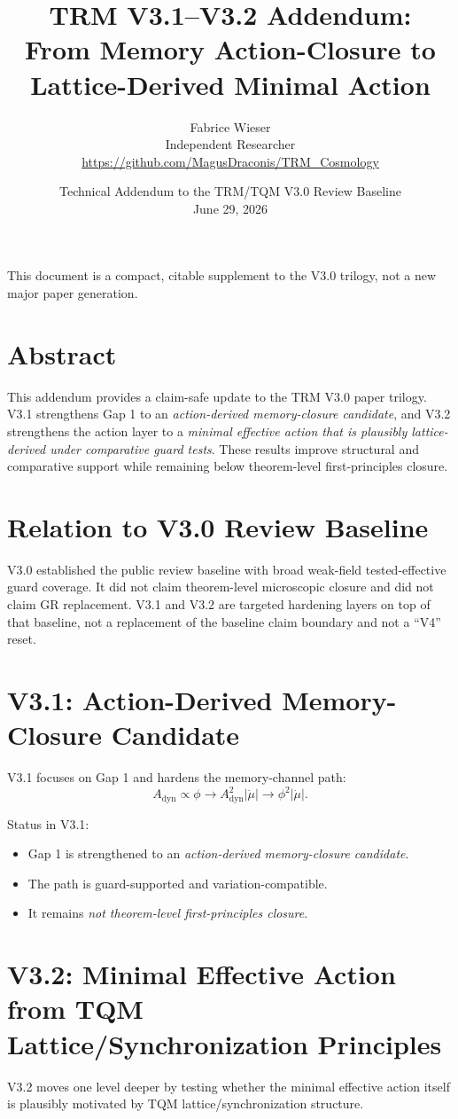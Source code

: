 \documentclass[11pt,a4paper]{article}
\title{TRM V3.1--V3.2 Addendum:\\From Memory Action-Closure to Lattice-Derived Minimal Action}
\author{
Fabrice Wieser\\
Independent Researcher\\
\url{https://github.com/MagusDraconis/TRM_Cosmology}
}
\date{
Technical Addendum to the TRM/TQM V3.0 Review Baseline\\
June 29, 2026
}
\begin{document}
\maketitle

\noindent
This document is a compact, citable supplement to the V3.0 trilogy, not a new major paper generation.

\section{Abstract}
This addendum provides a claim-safe update to the TRM V3.0 paper trilogy.
V3.1 strengthens Gap 1 to an \emph{action-derived memory-closure candidate}, and V3.2 strengthens the action layer to a \emph{minimal effective action that is plausibly lattice-derived under comparative guard tests}.
These results improve structural and comparative support while remaining below theorem-level first-principles closure.

\section{Relation to V3.0 Review Baseline}
V3.0 established the public review baseline with broad weak-field tested-effective guard coverage.
It did not claim theorem-level microscopic closure and did not claim GR replacement.
V3.1 and V3.2 are targeted hardening layers on top of that baseline, not a replacement of the baseline claim boundary and not a ``V4'' reset.

\section{V3.1: Action-Derived Memory-Closure Candidate}
V3.1 focuses on Gap 1 and hardens the memory-channel path:
\[
A_{\mathrm{dyn}} \propto \phi
\rightarrow
A_{\mathrm{dyn}}^2 \lvert \dot{\mu} \rvert
\rightarrow
\phi^2 \lvert \dot{\mu} \rvert.
\]

\noindent
Status in V3.1:
\begin{itemize}[leftmargin=1.5em]
\item Gap 1 is strengthened to an \emph{action-derived memory-closure candidate}.
\item The path is guard-supported and variation-compatible.
\item It remains \emph{not theorem-level first-principles closure}.
\end{itemize}

\section{V3.2: Minimal Effective Action from TQM Lattice/Synchronization Principles}
V3.2 moves one level deeper by testing whether the minimal effective action itself is plausibly motivated by TQM lattice/synchronization structure.
\end{document}
